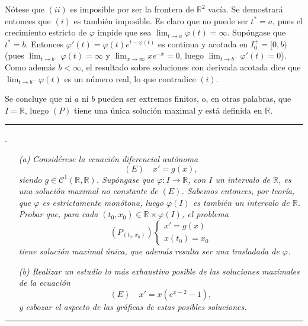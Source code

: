 \documentclass[11pt]{report}
\newcommand{\R}{\mathbb R}
\begin{document}
Nótese que $(ii)$ es imposible por ser la frontera de $\R^2$ vacía. Se demostrará entonces que $(i)$ es también imposible. Es claro que no puede ser $t^*=a$, pues el crecimiento estricto de $\varphi$ impide que sea $\lim_{t \to a}\varphi(t)=\infty$. Supóngase que $t^*=b$. Entonces $\varphi'(t)=\varphi(t)e^{t-\varphi(t)}$ es continua y acotada en $I_0^+=[0,b)$ (pues $\lim_{t \to b^-}\varphi(t)=\infty$ y $\lim_{x \to \infty}xe^{-x}=0$, luego $\lim_{t \to b^-}\varphi'(t)=0$). Como además $b < \infty$, el resultado sobre soluciones con derivada acotada dice que $\lim_{t \to b^-}\varphi(t)$ es un número real, lo que contradice $(i)$.

\vspace{2mm}

Se concluye que ni $a$ ni $b$ pueden ser extremos finitos, o, en otras palabras, que $I=\R$, luego $(P)$ tiene una única solución maximal y está definida en $\R$.

\vspace{4mm}

\hrule

\vspace{4mm}

.
\begin{itemize}
    \item[\textit{(a)}] \textit{Considérese la ecuación diferencial autónoma}
    \[(E) \quad x'=g(x),\]
    \textit{siendo $g \in \mathcal{C}^1(\R,\R)$. Supóngase que $\varphi \colon I \to \R$, con $I$ un intervalo de $\R$, es una solución maximal no constante de $(E)$. Sabemos entonces, por teoría, que $\varphi$ es estrictamente monótona, luego $\varphi(I)$ es también un intervalo de $\R$. Probar que, para cada $(t_0,x_0) \in \R \times \varphi(I)$, el problema}
    \[(P_{(t_0,x_0)}) \begin{cases}
        x'=g(x) \\
        x(t_0)=x_0
    \end{cases}\]
    \textit{tiene solución maximal única, que además resulta ser una trasladada de $\varphi$.}
    \item[\textit{(b)}] \textit{Realizar un estudio lo más exhaustivo posible de las soluciones maximales de la ecuación
    \[(E) \quad x'=x(e^{x-2}-1),\]}
    \textit{y esbozar el aspecto de las gráficas de estas posibles soluciones.}
\end{itemize}

\vspace{2mm}

\hrule
\end{document}
